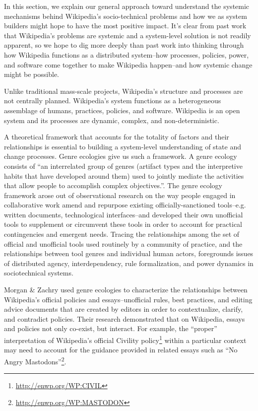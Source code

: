In this section, we explain our general approach toward understand the systemic mechanisms behind Wikipedia's socio-technical problems and how we as system builders might hope to have the most positive impact.  It's clear from past work that Wikipedia's problems are systemic and a system-level solution is not readily apparent, so we hope to dig more deeply than past work into thinking through how Wikipedia functions as a distributed system--how processes, policies, power, and software come together to make Wikipedia happen--and how systemic change might be possible.

  Unlike traditional mass-scale projects, Wikipedia's structure and processes are not centrally planned.  Wikipedia's system functions as a heterogeneous assemblage of humans, practices, policies, and software.  Wikipedia is an open system and its processes are dynamic, complex, and non-deterministic.

A theoretical framework that accounts for the totality of factors and their relationships is essential to building a system-level understanding of state and change processes.  Genre ecologies give us such a framework. A genre ecology consists of ``an interrelated group of genres (artifact types and the interpretive habits that have developed around them) used to jointly mediate the activities that allow people to accomplish complex objectives.''\cite{spinuzzi2000genre}. The genre ecology framework arose out of observational research on the way people engaged in collaborative work amend and repurpose existing officially-sanctioned tools--e.g. written documents, technological interfaces--and developed their own unofficial tools to supplement or circumvent these tools in order to account for practical contingencies and emergent needs. Tracing the relationships among the set of official and unofficial tools used routinely by a community of practice, and the relationships between tool genres and individual human actors, foregrounds issues of distributed agency, interdependency, rule formalization, and power dynamics in sociotechnical systems\cite{spinuzzi2003tracing}.

Morgan \& Zachry used genre ecologies to characterize the relationships between Wikipedia's official policies and essays--unofficial rules, best practices, and editing advice documents that are created by editors in order to contextualize, clarify, and contradict policies\cite{morgan2010negotiating}. Their research demonstrated that on Wikipedia, essays and policies not only co-exist, but interact. For example, the ``proper'' interpretation of Wikipedia's official Civility policy\footnote{\url{http://enwp.org/WP:CIVIL}} within a particular context may need to account for the guidance provided in related essays such as ``No Angry Mastodons''\footnote{\url{http://enwp.org/WP:MASTODON}}.

